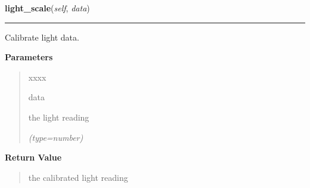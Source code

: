 \hspace{.8\funcindent}\begin{boxedminipage}{\funcwidth}

    \raggedright \textbf{light\_scale}(\textit{self}, \textit{data})

    \vspace{-1.5ex}

    \rule{\textwidth}{0.5\fboxrule}
\setlength{\parskip}{2ex}
    Calibrate light data.

\setlength{\parskip}{1ex}
      \textbf{Parameters}
      \vspace{-1ex}

      \begin{quote}
        \begin{Ventry}{xxxx}

          \item[data]

          the light reading

            {\it (type=number)}

        \end{Ventry}

      \end{quote}

      \textbf{Return Value}
    \vspace{-1ex}

      \begin{quote}
      the calibrated light reading

      \end{quote}

    \end{boxedminipage}

    \label{sensor_thread:Sensor:pressure_scale}

    \vspace{0.5ex}

